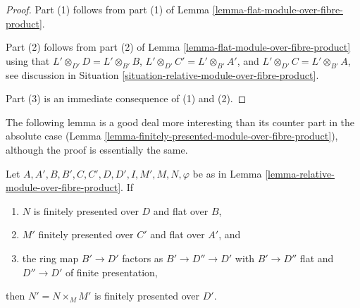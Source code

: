 \begin{proof}
Part (1) follows from part (1) of
Lemma \ref{lemma-flat-module-over-fibre-product}.

\medskip\noindent
Part (2) follows from part (2) of
Lemma \ref{lemma-flat-module-over-fibre-product}
using that $L' \otimes_{D'} D = L' \otimes_{B'} B$,
$L' \otimes_{D'} C' = L' \otimes_{B'} A'$, and
$L' \otimes_{D'} C = L' \otimes_{B'} A$, see discussion in
Situation \ref{situation-relative-module-over-fibre-product}.

\medskip\noindent
Part (3) is an immediate consequence of (1) and (2).
\end{proof}

\noindent
The following lemma is a good deal more interesting than its
counter part in the absolute case
(Lemma \ref{lemma-finitely-presented-module-over-fibre-product}),
although the proof is essentially the same.

\begin{lemma}
\label{lemma-relative-finitely-presented-module-over-fibre-product}
Let $A, A', B, B', C, C', D, D', I, M', M, N, \varphi$ be as in
Lemma \ref{lemma-relative-module-over-fibre-product}. If
\begin{enumerate}
\item $N$ is finitely presented over $D$ and flat over $B$,
\item $M'$ finitely presented over $C'$ and flat over $A'$, and
\item the ring map $B' \to D'$ factors as $B' \to D'' \to D'$
with $B' \to D''$ flat and $D'' \to D'$ of finite presentation,
\end{enumerate}
then $N' = N \times_M M'$ is finitely presented over $D'$.
\end{lemma}

